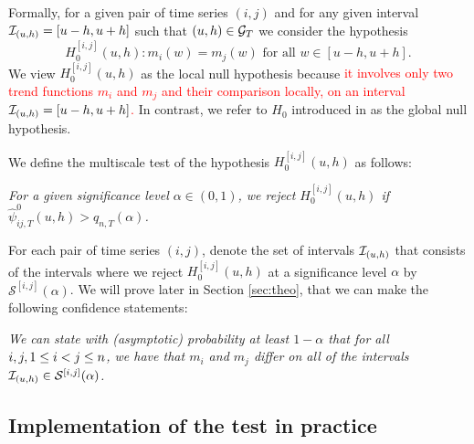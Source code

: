 \documentclass[a4paper,12pt]{article}
\makeatletter
\renewcommand{\eqref}[1]{\tagform@{\ref{#1}}}
\makeatother
\begin{document}
Formally, for a given pair of time series $(i, j)$ and for any given interval \linebreak $\mathcal{I}_{(u, h)} = [u-h, u+h]$ such that $(u, h) \in \mathcal{G}_T$ we consider the hypothesis 
\[ H_0^{[i,j]}(u,h): m_i(w) = m_j(w) \text{ for all } w \in [u-h,u+h]. \] 
We view $H_0^{[i,j]}(u,h)$ as the local null hypothesis because \textcolor{red}{it involves only two trend functions $m_i$ and $m_j$ and their comparison locally, on an interval $\mathcal{I}_{(u, h)} = [u-h, u+h]$.} In contrast, we refer to $H_0$ introduced in \eqref{eq:null} as the global null hypothesis.

We define the multiscale test of the hypothesis $H_0^{[i,j]}(u,h)$ as follows: 
\begin{center}
\begin{minipage}[c][1.25cm][c]{13cm}
\textit{For a given significance level $\alpha \in (0,1)$, we reject $H_0^{[i,j]}(u,h)$ if \linebreak $\hat{\psi}^0_{ij,T}(u, h) > q_{n,T}(\alpha)$.}
\end{minipage}
\end{center}

For each pair of time series $(i, j)$, denote the set of intervals $\mathcal{I}_{(u, h)}$ that consists of the intervals where we reject $H_0^{[i,j]}(u,h)$ at a significance level $\alpha$ by $\mathcal{S}^{[i, j]}(\alpha)$. We will prove later in Section \ref{sec:theo}, that we can make the following confidence statements:

\begin{center}
\begin{minipage}[c][1.45cm][c]{13cm}
\textit{We can state with (asymptotic) probability at least $1-\alpha$ that for all $i, j, \linebreak1\leq i < j \leq n$, we have that $m_i$ and $m_j$ differ on all of the intervals $\mathcal{I}_{(u, h)} \in \mathcal{S}^{[i, j]}(\alpha)$.}
\end{minipage}
\end{center}


\subsection{Implementation of the test in practice}\label{subsec:test:impl}
\end{document}
